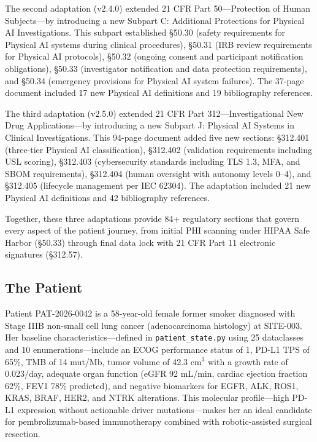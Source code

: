 \documentclass{article}
\begin{document}
The second adaptation (v2.4.0) extended 21 CFR Part 50---Protection of Human Subjects---by introducing a new Subpart C: Additional Protections for Physical AI Investigations. This subpart established \S50.30 (safety requirements for Physical AI systems during clinical procedures), \S50.31 (IRB review requirements for Physical AI protocols), \S50.32 (ongoing consent and participant notification obligations), \S50.33 (investigator notification and data protection requirements), and \S50.34 (emergency provisions for Physical AI system failures). The 37-page document included 17 new Physical AI definitions and 19 bibliography references.

The third adaptation (v2.5.0) extended 21 CFR Part 312---Investigational New Drug Applications---by introducing a new Subpart J: Physical AI Systems in Clinical Investigations. This 94-page document added five new sections: \S312.401 (three-tier Physical AI classification), \S312.402 (validation requirements including USL scoring), \S312.403 (cybersecurity standards including TLS 1.3, MFA, and SBOM requirements), \S312.404 (human oversight with autonomy levels 0--4), and \S312.405 (lifecycle management per IEC 62304). The adaptation included 21 new Physical AI definitions and 42 bibliography references.

Together, these three adaptations provide 84+ regulatory sections that govern every aspect of the patient journey, from initial PHI scanning under HIPAA Safe Harbor (\S50.33) through final data lock with 21 CFR Part 11 electronic signatures (\S312.57).

\subsection{The Patient}
\label{sec:the-patient}

Patient PAT-2026-0042 is a 58-year-old female former smoker diagnosed with Stage IIIB non-small cell lung cancer (adenocarcinoma histology) at SITE-003. Her baseline characteristics---defined in \texttt{patient\_state.py} using 25 dataclasses and 10 enumerations---include an ECOG performance status of 1, PD-L1 TPS of 65\%, TMB of 14 mut/Mb, tumor volume of 42.3 cm$^3$ with a growth rate of 0.023/day, adequate organ function (eGFR 92 mL/min, cardiac ejection fraction 62\%, FEV1 78\% predicted), and negative biomarkers for EGFR, ALK, ROS1, KRAS, BRAF, HER2, and NTRK alterations. This molecular profile---high PD-L1 expression without actionable driver mutations---makes her an ideal candidate for pembrolizumab-based immunotherapy combined with robotic-assisted surgical resection.
\end{document}
